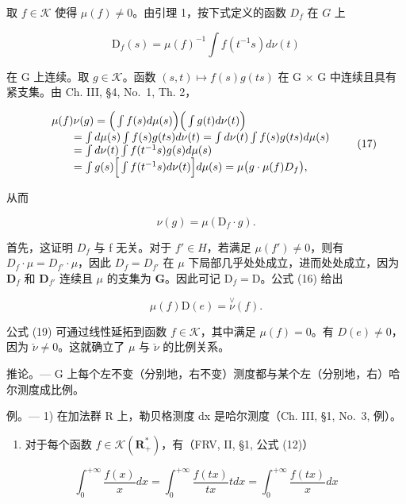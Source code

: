 取 \(f \in \mathcal{K}\) 使得 \(\mu(f) \neq 0\)。由引理 1，按下式定义的函数 \(D_f\) 在 \(G\) 上

\[
\mathrm{D} _ {f} (s) = \mu (f) ^ {- 1} \int f (t ^ {- 1} s) d \nu (t)\tag{16}
\]

在 G 上连续。取 \(g \in \mathcal{K}\)。函数 \((s, t) \mapsto f(s)g(ts)\) 在 G × G 中连续且具有紧支集。由 Ch. III, §4, No.~1, Th. 2，

\[
\begin{array}{r l} & {\mu (f) \nu (g) = \Big (\int f (s) d \mu (s) \Big) \Big (\int g (t) d \nu (t) \Big)} \\ & {\qquad = \int d \mu (s) \int f (s) g (t s) d \nu (t) = \int d \nu (t) \int f (s) g (t s) d \mu (s)} \\ & {\qquad = \int d \nu (t) \int f (t ^ {- 1} s) g (s) d \mu (s)} \\ & {\qquad = \int g (s) \Big [ \int f (t ^ {- 1} s) d \nu (t) \Big ] d \mu (s) = \mu \big (g \cdot \mu (f) D _ {f} \big),} \end{array}\tag{17}
\]

从而

\[
\nu (g) = \mu (\mathrm{D} _ {f} \cdot g).\tag{18}
\]

首先，这证明 \(D_{f}\) 与 f 无关。对于 \(f' \in H\)，若满足 \(\mu(f') \neq 0\)，则有 \(D_{f} \cdot \mu = D_{f'} \cdot \mu\)，因此 \(D_{f} = D_{f'}\) 在 \(\mu\) 下局部几乎处处成立，进而处处成立，因为 \(\mathbf{D}_f\) 和 \(\mathbf{D}_{f'}\) 连续且 \(\mu\) 的支集为 \(\mathbf{G}\)。因此可记 \(\mathrm{D}_f = \mathrm{D}\)。公式 (16) 给出

\[
\mu (f) \mathrm{D} (e) = \stackrel {\vee} {\nu} (f).\tag{19}
\]

公式 (19) 可通过线性延拓到函数 \(f \in \mathcal{K}\)，其中满足 \(\mu(f) = 0\)。有 \(D(e) \neq 0\)，因为 \(\check{\nu} \neq 0\)。这就确立了 \(\mu\) 与 \(\check{\nu}\) 的比例关系。

推论。--- G 上每个左不变（分别地，右不变）测度都与某个左（分别地，右）哈尔测度成比例。

例。--- 1) 在加法群 R 上，勒贝格测度 dx 是哈尔测度（Ch. III, §1, No.~3, 例）。

\begin{enumerate}
\def\labelenumi{\arabic{enumi})}
\setcounter{enumi}{1}
\tightlist
\item
   对于每个函数 \(f \in \mathcal{K}(\mathbf{R}_+^*)\)，有（FRV, II, §1, 公式 (12)）
\end{enumerate}

\[
\int_ {0} ^ {+ \infty} \frac {f (x)}{x} d x = \int_ {0} ^ {+ \infty} \frac {f (t x)}{t x} t d x = \int_ {0} ^ {+ \infty} \frac {f (t x)}{x} d x
\]

